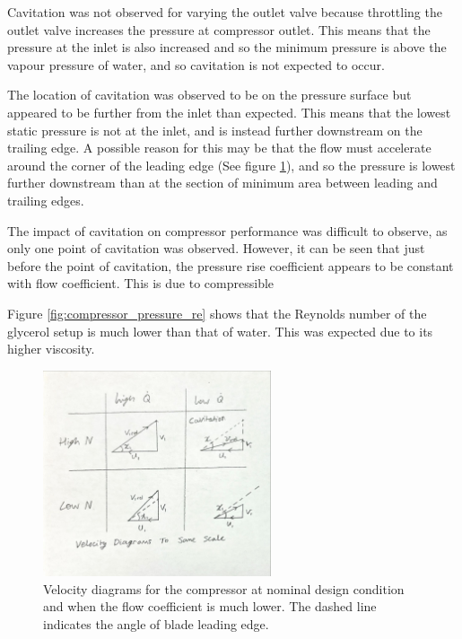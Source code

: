 \documentclass{article}
\begin{document}
Cavitation was not observed for varying the outlet valve because throttling the outlet valve increases the pressure at compressor outlet.
This means that the pressure at the inlet is also increased and so the minimum pressure is above the vapour pressure of water,
and so cavitation is not expected to occur.

The location of cavitation was observed to be on the pressure surface but appeared to be further from the inlet than expected.
This means that the lowest static pressure is not at the inlet, and is instead further downstream on the trailing edge.
A possible reason for this may be that the flow must accelerate around the corner of the leading edge (See figure \ref{fig:flow_scenario_velocity_diagrams}), and so the pressure is
lowest further downstream than at the section of minimum area between leading and trailing edges.

The impact of cavitation on compressor performance was difficult to observe, as only one point of cavitation was observed.
However, it can be seen that just before the point of cavitation, the pressure rise coefficient appears to be constant with flow coefficient.
This is due to compressible 



Figure \ref{fig:compressor_pressure_re} shows that the Reynolds number of the glycerol setup is much lower than that of water.
This was expected due to its higher viscosity.



\begin{figure}[H]
    \centering
    \includegraphics[width=0.6\textwidth]{flow_scenario_velocity_diagrams.jpg}
    \caption{Velocity diagrams for the compressor at nominal design condition and when the flow coefficient is much lower. The dashed line indicates the angle of blade leading edge.}
    \label{fig:flow_scenario_velocity_diagrams}
\end{figure}
\end{document}
